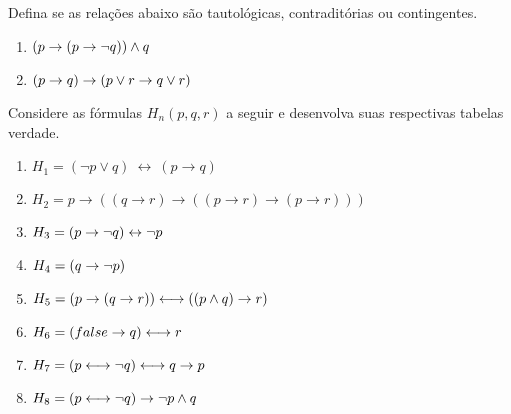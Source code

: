 \documentclass[a4paper, 11pt]{article}
\begin{document}
    \begin{question}
        Defina se as relações abaixo são tautológicas, contraditórias ou contingentes.
        \vspace*{-3mm}
        \begin{enumerate}[itemsep=-1mm]
            \item $(p \rightarrow (p \rightarrow \lnot q)) \land q$
            \item $(p \rightarrow q) \rightarrow (p \lor r \rightarrow q \lor r)$
        \end{enumerate}
    \end{question}

    \begin{question}
        Considere as fórmulas $H_n(p, q, r)$ a seguir e desenvolva suas respectivas tabelas verdade.
        \vspace{-3mm}
        \begin{enumerate}[itemsep=-1mm]
            \item[] $H_1 = (\lnot p \lor q)~\leftrightarrow~(p \rightarrow q)$
            \item[] $H_2 = p \rightarrow ((q \rightarrow r) \rightarrow ((p \rightarrow r) \rightarrow (p \rightarrow r)))$ 
            \item[] $H_3 = (p \rightarrow \lnot q) \leftrightarrow \lnot p $
            \item[] $H_4 = (q \rightarrow \lnot p) $
            \item[] $H_5 = (p \rightarrow (q \rightarrow r)) \longleftrightarrow ((p \land q) \rightarrow r) $
            \item[] $H_6 = (false \rightarrow q) \longleftrightarrow r$
            \item[] $H_7 = (p \longleftrightarrow \lnot q) \longleftrightarrow q \rightarrow p$
            \item[] $H_8 = (p \longleftrightarrow \lnot q) \rightarrow \lnot p \land q$
        \end{enumerate}
    \end{question}
    
\end{document}
